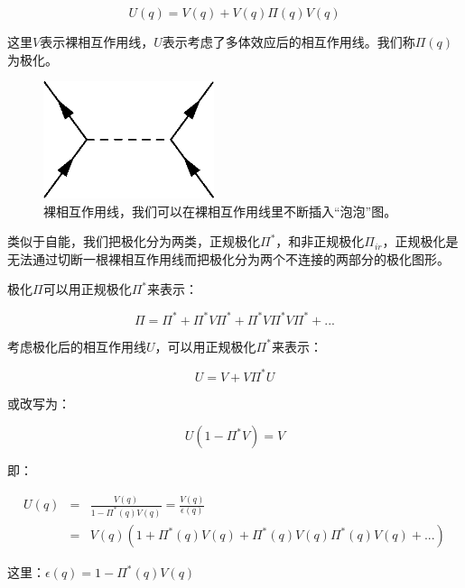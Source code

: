 \begin{equation*}
U(q) = V(q)  + V(q) \Pi(q) V(q)
\end{equation*}

这里$V$表示裸相互作用线，$U$表示考虑了多体效应后的相互作用线。我们称$\Pi(q) $为极化。

\begin{figure}[htbp]
\begin{center}
\includegraphics[width=5cm]{Zero/polarized.png}
\caption{裸相互作用线，我们可以在裸相互作用线里不断插入“泡泡”图。}
\end{center}
\end{figure}

类似于自能，我们把极化分为两类，正规极化$\Pi^*$，和非正规极化$\Pi_{ir}$，正规极化是无法通过切断一根裸相互作用线而把极化分为两个不连接的两部分的极化图形。

极化$\Pi$可以用正规极化$\Pi^*$来表示：

\begin{equation}
\Pi = \Pi^* + \Pi^* V \Pi^* + \Pi^* V \Pi^* V \Pi^* + ... 
\end{equation}

考虑极化后的相互作用线$U$，可以用正规极化$\Pi^*$来表示：

\begin{equation}
U = V + V \Pi^* U
\end{equation}

或改写为：

\begin{equation*}
U (1 - \Pi^* V) = V
\end{equation*}

即：

\begin{eqnarray*}
U(q)  & = &  \frac{V(q)}{1 - \Pi^*(q) V(q) } = \frac{V(q)}{\epsilon(q)} \\
{} & = & V(q) ( 1 + \Pi^* (q) V (q) + \Pi^* (q) V (q) \Pi^* (q) V (q) + ...  )
\end{eqnarray*}

这里：$\epsilon(q) = 1 - \Pi^*(q) V(q) $
